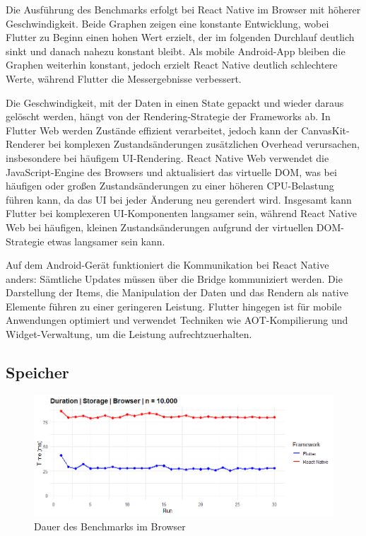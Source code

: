 Die Ausführung des Benchmarks erfolgt bei React Native im Browser mit höherer Geschwindigkeit. Beide Graphen zeigen eine konstante Entwicklung, wobei Flutter zu Beginn einen hohen Wert erzielt, der im folgenden Durchlauf deutlich sinkt und danach nahezu konstant bleibt. Als mobile Android-App bleiben die Graphen weiterhin konstant, jedoch erzielt React Native deutlich schlechtere Werte, während Flutter die Messergebnisse verbessert.

Die Geschwindigkeit, mit der Daten in einen State gepackt und wieder daraus gelöscht werden, hängt von der Rendering-Strategie der Frameworks ab. In Flutter Web werden Zustände effizient verarbeitet, jedoch kann der CanvasKit-Renderer bei komplexen Zustandsänderungen zusätzlichen Overhead verursachen, insbesondere bei häufigem UI-Rendering. React Native Web verwendet die JavaScript-Engine des Browsers und aktualisiert das virtuelle DOM, was bei häufigen oder großen Zustandsänderungen zu einer höheren CPU-Belastung führen kann, da das UI bei jeder Änderung neu gerendert wird. Insgesamt kann Flutter bei komplexeren UI-Komponenten langsamer sein, während React Native Web bei häufigen, kleinen Zustandsänderungen aufgrund der virtuellen DOM-Strategie etwas langsamer sein kann.

Auf dem Android-Gerät funktioniert die Kommunikation bei React Native anders: Sämtliche Updates müssen über die Bridge kommuniziert werden. Die Darstellung der Items, die Manipulation der Daten und das Rendern als native Elemente führen zu einer geringeren Leistung. Flutter hingegen ist für mobile Anwendungen optimiert und verwendet Techniken wie AOT-Kompilierung und Widget-Verwaltung, um die Leistung aufrechtzuerhalten.

\newpage
\subsection{Speicher}
\begin{figure}[H]
    \centering
    \includegraphics[width=1\linewidth]{images/web/Storage.png}
    \caption{Dauer des Benchmarks im Browser}
\end{figure}

